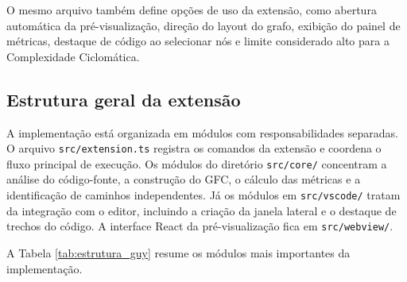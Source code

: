 O mesmo arquivo também define opções de uso da extensão, como abertura automática da pré-visualização, direção do layout do grafo, exibição do painel de métricas, destaque de código ao selecionar nós e limite considerado alto para a Complexidade Ciclomática.


\subsection{Estrutura geral da extensão}

A implementação está organizada em módulos com responsabilidades separadas. O arquivo \texttt{src/extension.ts} registra os comandos da extensão e coordena o fluxo principal de execução. Os módulos do diretório \texttt{src/core/} concentram a análise do código-fonte, a construção do GFC, o cálculo das métricas e a identificação de caminhos independentes. Já os módulos em \texttt{src/vscode/} tratam da integração com o editor, incluindo a criação da janela lateral e o destaque de trechos do código. A interface React da pré-visualização fica em \texttt{src/webview/}.

A Tabela \ref{tab:estrutura_guy} resume os módulos mais importantes da implementação.

